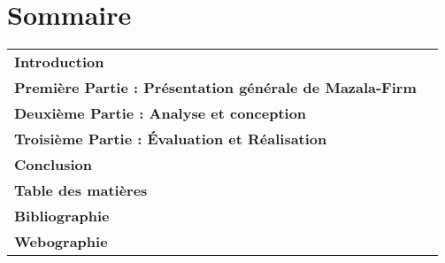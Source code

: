 \documentclass[12pt,french]{extreport}
\begin{document}







\listoffigures
{}
\listoftables
{}

\chapter*{Sommaire}
\noindent\begin{tabularx}{\textwidth}{Xr}
  \textbf{Introduction} \dotfill \pageref{chap:introduction} \\

  \textbf{Première Partie : Présentation générale de Mazala-Firm} \dotfill \pageref{part:presentation} \\

  \textbf{Deuxième Partie : Analyse et conception} \dotfill \pageref{part:analyse-et-conception} \\

  \textbf{Troisième Partie : Évaluation et Réalisation} \dotfill \pageref{part:evaluation-et-realisation} \\

  \textbf{Conclusion} \dotfill \pageref{chap:conclusion} \\

  \textbf{Table des matières} \dotfill \pageref{sec:tableofcontents} \\

  \textbf{Bibliographie} \dotfill \pageref{sec:bibliographie} \\

  \textbf{Webographie} \dotfill \pageref{sec:webographie} \\
\end{tabularx}






\newpage









\label{sec:tableofcontents}
\tableofcontents
\end{document}
